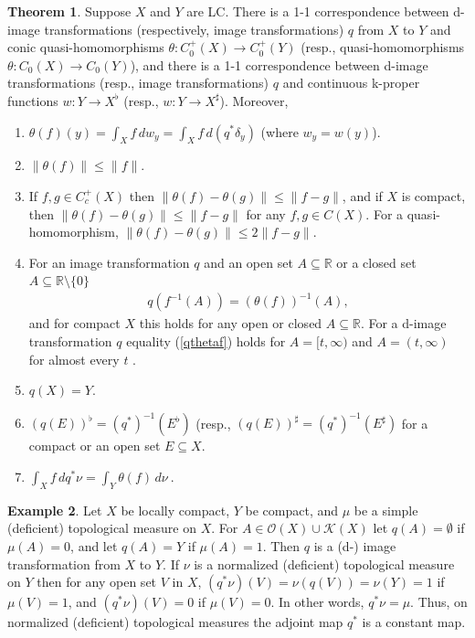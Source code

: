 \documentclass[sn-mathphys-num]{sn-jnl}%
\theoremstyle{thmstyleone}%
\theoremstyle{definition}
\newtheorem{theorem}{Theorem}%
\newtheorem{example}[theorem]{Example}
\begin{document}
\begin{theorem} \label{ITqh}
Suppose $X$ and $Y$  are LC. There is a 1-1 correspondence between d-image transformations (respectively, image transformations) 
$q$ from $X$ to $Y$ and 
conic quasi-homomorphisms $\theta : C_0^+(X) \longrightarrow C_0^+(Y)$ 
(resp., quasi-homomorphisms $\theta : C_0(X) \longrightarrow C_0(Y)$),
and there is a 1-1 correspondence between d-image transformations (resp., image transformations) 
$q$ and continuous k-proper functions $w: Y \longrightarrow X^{\flat}$ (resp.,   $w: Y \longrightarrow X^\sharp$).
Moreover,
\begin{enumerate}[leftmargin=0.25in, label=(h\arabic*),ref=(h\arabic*)]
\item \label{ITqh1}
$\theta(f)(y) = \int_X f\, dw_y =  \int_X f \, d(q^*\delta_y)$ (where $w_y = w(y)$).
\item \label{ITqh6}
$ \| \theta(f) \| \le \| f\|$. 
\item \label{ITqh6a}
If $ f, g \in C_c^+(X)$ then $ \| \theta(f) - \theta(g) \| \le \| f -g\|$, and if $X$ is compact, then 
$ \| \theta(f) - \theta(g) \| \le \| f -g\|$ for any $f,g \in C(X)$. 
For a quasi-homomorphism, $\| \theta(f) - \theta(g) \| \le 2 \| f -g\|$. 
\item \label{ITqh4}
For an image transformation $q$ and an open set $ A \subseteq \mathbb{R}$ or a closed set $A \subseteq \mathbb{R} \setminus \{ 0\}$ 
\begin{align} \label{qthetaf}
q(f^{-1}(A)) = (\theta(f))^{-1} (A),
\end{align}
and for compact $X$ this holds for any open or closed $ A \subseteq \mathbb{R}$. For a d-image transformation $q$ equality (\ref{qthetaf}) holds for
$A=[t, \infty)$ and $A=(t, \infty)$ for  almost every $t$ .
\item \label{ITqh12}
$q(X) = Y$.
\item \label{ITqh15}
$(q(E))^{\flat}  = (q^*)^{-1}(E^{\flat})$ (resp., $(q(E))^{\sharp}  = (q^*)^{-1}(E^{\sharp})$ for a compact or an open set $E \subseteq X$.
\item \label{ITqh5}
$ \int_X f \, dq^*\nu = \int_Y \theta(f) \, d\nu \  $.
\end{enumerate}
\end{theorem}

\begin{example} \label{consQst}
Let $X$ be locally compact, $Y$ be compact, and  $\mu$ be a simple (deficient) topological measure on $X$. 
For $A \in \mathscr{O}(X) \cup \mathscr{K}(X)$ let $q(A) = \emptyset$ if $ \mu(A) = 0$, and let $q(A) = Y$ if $ \mu(A) = 1$.
Then $q$ is a (d-) image transformation from $X$ to $Y$. If $ \nu$ is a normalized (deficient) topological measure on $Y$ 
then for any open set $V$ in $X$,
$(q^*\nu)(V) = \nu(q(V)) = \nu(Y) = 1$ if $ \mu(V) =1$, and $(q^*\nu)(V) = 0$ if $ \mu(V) =0$. In other words, $q^*\nu = \mu$.
Thus, on  normalized (deficient) topological measures the adjoint map $q^*$ is a constant map.
\end{example} 
\end{document}
